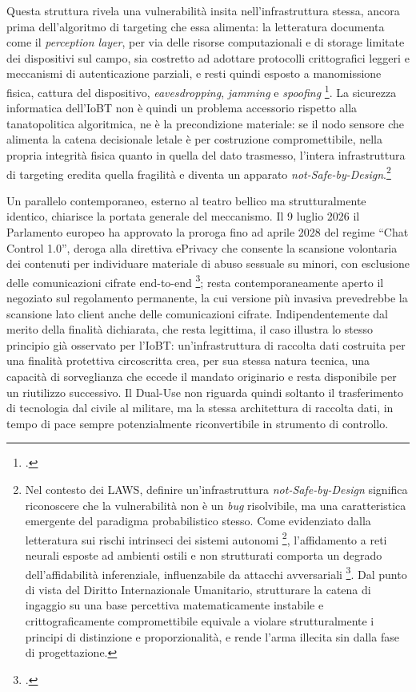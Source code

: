 \documentclass[a4paper,12pt]{report}
\begin{document}
Questa struttura rivela una vulnerabilità insita nell'infrastruttura stessa,
ancora prima dell'algoritmo di targeting che essa alimenta: la letteratura
documenta come il \textit{perception layer}, per via delle risorse computazionali
e di storage limitate dei dispositivi sul campo, sia costretto ad adottare
protocolli crittografici leggeri e meccanismi di autenticazione parziali, e resti
quindi esposto a manomissione fisica, cattura del dispositivo,
\textit{eavesdropping}, \textit{jamming} e \textit{spoofing}
\footcite{kufakunesu_2025_iobt}. La sicurezza informatica dell'IoBT non è quindi
un problema accessorio rispetto alla tanatopolitica algoritmica, ne è la
precondizione materiale: se il nodo sensore che alimenta la catena decisionale
letale è per costruzione compromettibile, nella propria integrità fisica quanto
in quella del dato trasmesso, l'intera infrastruttura di targeting eredita quella
fragilità e diventa un apparato \textit{not-Safe-by-Design}.\footnote{Nel
contesto dei LAWS, definire un'infrastruttura \textit{not-Safe-by-Design}
significa riconoscere che la vulnerabilità non è un \textit{bug} risolvibile, ma
una caratteristica emergente del paradigma probabilistico stesso. Come evidenziato
dalla letteratura sui rischi intrinseci dei sistemi autonomi
\footcite{podar_2025}, l'affidamento a reti neurali esposte ad ambienti ostili e
non strutturati comporta un degrado dell'affidabilità inferenziale, influenzabile
da attacchi avversariali \footcite{cina_2023_poisoning}. Dal punto di vista del
Diritto Internazionale Umanitario, strutturare la catena di ingaggio su una base
percettiva matematicamente instabile e crittograficamente compromettibile
equivale a violare strutturalmente i principi di distinzione e proporzionalità, e
rende l'arma illecita sin dalla fase di progettazione.}

Un parallelo contemporaneo, esterno al teatro bellico ma strutturalmente
identico, chiarisce la portata generale del meccanismo. Il 9 luglio 2026 il
Parlamento europeo ha approvato la proroga fino ad aprile 2028 del regime
``Chat Control 1.0'', deroga alla direttiva ePrivacy che consente la scansione
volontaria dei contenuti per individuare materiale di abuso sessuale su minori,
con esclusione delle comunicazioni cifrate end-to-end
\footcite{euronews_chatcontrol_2026}; resta contemporaneamente aperto il
negoziato sul regolamento permanente, la cui versione più invasiva prevedrebbe
la scansione lato client anche delle comunicazioni cifrate. Indipendentemente
dal merito della finalità dichiarata, che resta legittima, il caso illustra lo
stesso principio già osservato per l'IoBT: un'infrastruttura di raccolta dati
costruita per una finalità protettiva circoscritta crea, per sua stessa natura
tecnica, una capacità di sorveglianza che eccede il mandato originario e resta
disponibile per un riutilizzo successivo. Il Dual-Use non riguarda quindi
soltanto il trasferimento di tecnologia dal civile al militare, ma la stessa
architettura di raccolta dati, in tempo di pace sempre potenzialmente
riconvertibile in strumento di controllo.
\end{document}
